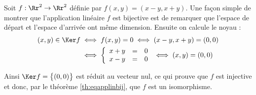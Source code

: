 \documentclass[class=report,crop=false]{standalone}
\begin{document}
\begin{exemple}
Soit $f : \Rr^2 \to \Rr^2$ définie par $f(x,y) = (x-y,x+y)$.
Une façon simple de montrer que l'application linéaire $f$ est bijective est de remarquer
que l'espace de départ et l'espace d'arrivée ont même dimension.
Ensuite on calcule le noyau :
\begin{align*}
(x,y) \in \Ker f &\iff f(x,y)=0 \iff (x-y,x+y)=(0,0) \\
&\iff
\left\{
\begin{array}{rcl}
x+y & = & 0 \\
x-y & = & 0 \\
\end{array}
\right.
\iff (x,y) = (0,0)
\end{align*}

Ainsi $\Ker f = \big\{(0,0)\big\}$ est réduit au vecteur nul, ce qui prouve que $f$ est injective
et donc, par le théorème \ref{th:eqapplinbij}, que $f$ est un isomorphisme.
\end{exemple}
\end{document}
